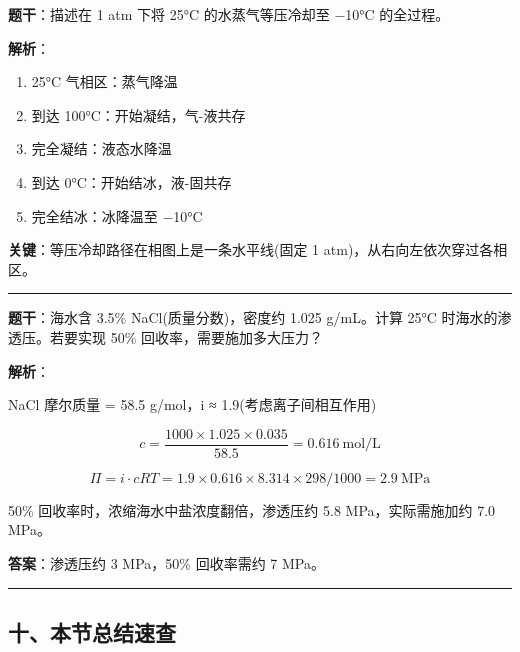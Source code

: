 \textbf{题干}：描述在 1 atm 下将 25°C 的水蒸气等压冷却至 −10°C 的全过程。

\textbf{解析}：

\begin{enumerate}
\def\labelenumi{\arabic{enumi}.}
\tightlist
\item
  25°C 气相区：蒸气降温
\item
  到达 100°C：开始凝结，气-液共存
\item
  完全凝结：液态水降温
\item
  到达 0°C：开始结冰，液-固共存
\item
  完全结冰：冰降温至 −10°C
\end{enumerate}

\textbf{关键}：等压冷却路径在相图上是一条水平线(固定 1 atm)，从右向左依次穿过各相区。

\begin{center}\rule{0.5\linewidth}{0.5pt}\end{center}

\textbf{题干}：海水含 3.5\% NaCl(质量分数)，密度约 1.025 g/mL。计算 25°C 时海水的渗透压。若要实现 50\% 回收率，需要施加多大压力？

\textbf{解析}：

NaCl 摩尔质量 = 58.5 g/mol，i ≈ 1.9(考虑离子间相互作用)

\[c = \frac{1000 \times 1.025 \times 0.035}{58.5} = 0.616\ \mathrm{mol/L}\]

\[\Pi = i \cdot cRT = 1.9 \times 0.616 \times 8.314 \times 298 / 1000 = 2.9\ \mathrm{MPa}\]

50\% 回收率时，浓缩海水中盐浓度翻倍，渗透压约 5.8 MPa，实际需施加约 7.0 MPa。

\textbf{答案}：渗透压约 3 MPa，50\% 回收率需约 7 MPa。

\begin{center}\rule{0.5\linewidth}{0.5pt}\end{center}

\subsection{十、本节总结速查}\label{ux5341ux672cux8282ux603bux7ed3ux901fux67e5}

